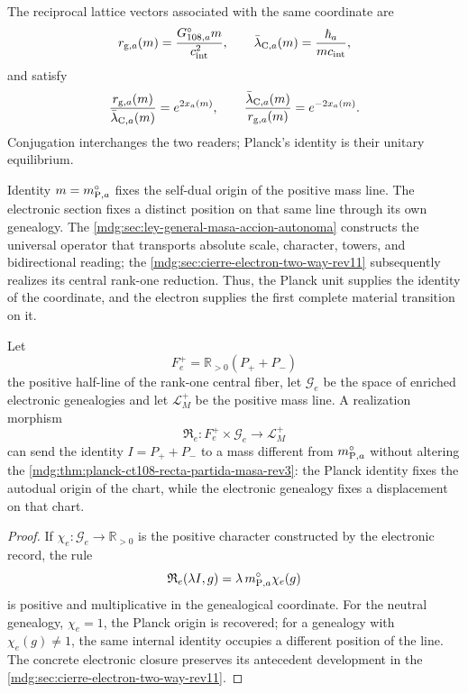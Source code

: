 The reciprocal lattice vectors associated with the same coordinate are
\[
 r_{{\rm g},a}(m)=\frac{G_{108,a}^{\circ}m}{c_{\rm int}^{2}},
 \qquad
 \bar\lambda_{{\rm C},a}(m)=\frac{\hbar_a}{mc_{\rm int}},
\]
and satisfy
\begin{equation}
 \frac{r_{{\rm g},a}(m)}{\bar\lambda_{{\rm C},a}(m)}
 =e^{2x_a(m)},
 \qquad
 \frac{\bar\lambda_{{\rm C},a}(m)}{r_{{\rm g},a}(m)}
 =e^{-2x_a(m)}.
 \label{mdg:eq:planck-ct108-lectores-exponenciales-rev3}
\end{equation}
Conjugation interchanges the two readers; Planck's identity is their unitary equilibrium.

\begin{remark}
Identity \(m=m_{{\rm P},a}^{\circ}\) fixes the self-dual origin of the
positive mass line. The electronic section fixes a distinct position on
that same line through its own genealogy. The
\cref{mdg:sec:ley-general-masa-accion-autonoma} constructs the universal operator
that transports absolute scale, character, towers, and bidirectional reading;
the \cref{mdg:sec:cierre-electron-two-way-rev11} subsequently realizes its central
rank-one reduction. Thus, the Planck unit supplies the identity of
the coordinate, and the electron supplies the first complete material transition
on it.
\end{remark}

\begin{proposition}
\label{mdg:prop:planck-ct108-realizacion-centro-electron-rev3}
Let
\[
 F_e^+=\mathbb R_{>0}(P_++P_-)
\]
the positive half-line of the rank-one central fiber, let
\(\mathcal G_e\) be the space of enriched electronic
genealogies and let \(\mathcal L_M^+\) be the positive mass
line. A realization morphism
\[
 \mathfrak R_e:
 F_e^+\times\mathcal G_e\longrightarrow\mathcal L_M^+
\]
can send the identity \(I=P_++P_-\) to a mass different from
\(m_{{\rm P},a}^{\circ}\) without altering the
\cref{mdg:thm:planck-ct108-recta-partida-masa-rev3}: the Planck identity fixes the
autodual origin of the chart, while the electronic genealogy fixes a
displacement on that chart.
\end{proposition}

\begin{proof}
If \(\chi_e:\mathcal G_e\to\mathbb R_{>0}\) is the positive character constructed
by the electronic record, the rule
\[
 \mathfrak R_e(\lambda I,g)
 =\lambda\,m_{{\rm P},a}^{\circ}\chi_e(g)
\]
is positive and multiplicative in the genealogical coordinate. For the neutral
genealogy, \(\chi_e=1\), the Planck origin is recovered; for a genealogy with
\(\chi_e(g)\ne1\), the same internal identity occupies a different position of
the line. The concrete electronic closure preserves its antecedent development in the
\cref{mdg:sec:cierre-electron-two-way-rev11}.
\end{proof}
